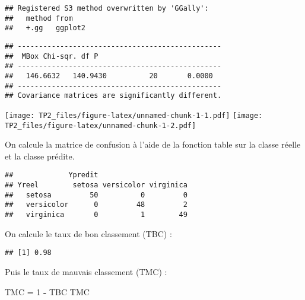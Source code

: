 \documentclass[
]{article}
\newenvironment{Shaded}{\begin{snugshade}}{\end{snugshade}}
\newcommand{\DataTypeTok}[1]{\textcolor[rgb]{0.13,0.29,0.53}{#1}}
\newcommand{\DecValTok}[1]{\textcolor[rgb]{0.00,0.00,0.81}{#1}}
\newcommand{\KeywordTok}[1]{\textcolor[rgb]{0.13,0.29,0.53}{\textbf{#1}}}
\newcommand{\NormalTok}[1]{#1}
\newcommand{\OperatorTok}[1]{\textcolor[rgb]{0.81,0.36,0.00}{\textbf{#1}}}
\newcommand{\StringTok}[1]{\textcolor[rgb]{0.31,0.60,0.02}{#1}}
\begin{document}
\begin{verbatim}
## Registered S3 method overwritten by 'GGally':
##   method from   
##   +.gg   ggplot2
\end{verbatim}

\begin{verbatim}
## ------------------------------------------------
##  MBox Chi-sqr. df P
## ------------------------------------------------
##   146.6632   140.9430          20       0.0000
## ------------------------------------------------
## Covariance matrices are significantly different.
\end{verbatim}

\texttt{[image: TP2\_files/figure-latex/unnamed-chunk-1-1.pdf]}
\texttt{[image: TP2\_files/figure-latex/unnamed-chunk-1-2.pdf]}

On calcule la matrice de confusion à l'aide de la fonction table sur la
classe réelle et la classe prédite.

\begin{Shaded}
\end{Shaded}

\begin{verbatim}
##             Ypredit
## Yreel        setosa versicolor virginica
##   setosa         50          0         0
##   versicolor      0         48         2
##   virginica       0          1        49
\end{verbatim}

On calcule le taux de bon classement (TBC) :

\begin{Shaded}
\end{Shaded}

\begin{verbatim}
## [1] 0.98
\end{verbatim}

Puis le taux de mauvais classement (TMC) :

\begin{Shaded}
\begin{Highlighting}[]
\NormalTok{TMC =}\StringTok{ }\DecValTok{1} \OperatorTok{-}\StringTok{ }\NormalTok{TBC}
\NormalTok{TMC}
\end{Highlighting}
\end{Shaded}
\end{document}

